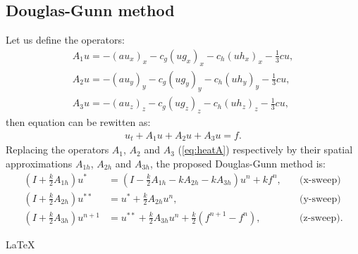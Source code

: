 \documentclass[12pt]{article}
\begin{document}
\subsection{Douglas-Gunn method}
Let us define the operators:
\begin{eqnarray}
A_1u = -(au_x)_x  - c_g(u g_x)_x - c_h(u h_x)_x  - \frac{1}{3}cu, \nonumber \\
A_2u = -(au_y)_y  - c_g(u g_y)_y - c_h(u h_y)_y  - \frac{1}{3}cu, \nonumber \\
A_3u = -(au_z)_z  - c_g(u g_z)_z - c_h(u h_z)_z  - \frac{1}{3}cu, \nonumber
\end{eqnarray}
then equation %
 can be rewitten as:
\begin{eqnarray} 
u_t + A_1u + A_2u  + A_3 u= f. \label{eq:heatA}
\end{eqnarray}
Replacing the operators $A_1$, $A_2$ and $A_3$ (\ref{eq:heatA}) respectively
by their spatial approximations $A_{1h}$, $A_{2h}$ and $A_{3h}$, the proposed Douglas-Gunn method
is:
\begin{align*}
(I+\frac{k}{2}A_{1h})u^* &= (I-\frac{k}{2}A_{1h} - k A_{2h} - k A_{3h})u^n +
k f^{n}, \quad &\text{(x-sweep)}\\
(I+\frac{k}{2}A_{2h})u^{**} &= u^* + \frac{k}{2}A_{2h} u^n , \quad &\text{(y-sweep)}\\
(I + \frac{k}{2} A_{3h})u^{n+1} &= u^{**} + \frac{k}{2}A_{3h} u^n + \frac{k}{2}
(f^{n+1} - f^{n}), \quad &\text{(z-sweep)}.
\end{align*} 

 

{\LaTeX}
\end{document}
